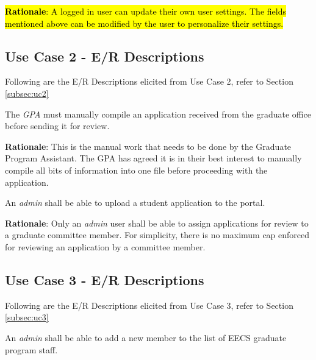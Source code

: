 \documentclass[fontsize=12pt,paper=letter,twoside]{scrartcl}
\begin{document}
\smallskip
\noindent \hl{\textbf{Rationale}: A logged in user can update their own user settings. The fields mentioned above can be modified by the user to personalize their settings.}


\subsection{Use Case 2 - E/R Descriptions}

Following are the E/R Descriptions elicited from Use Case 2, refer to Section \ref{subsec:uc2}

\genenv
{The \emph{GPA} must manually compile an application received from the graduate office before sending it for review. \\}
{}
\label{E3}

\smallskip
\noindent \textbf{Rationale}: This is the manual work that needs to be done by the Graduate Program Assistant. The GPA has agreed it is in their best interest to manually compile all bits of information into one file before proceeding with the application.

\genreq
{An \emph{admin} shall be able to upload a student application to the portal.\\}
{}
\label{R7}

\smallskip
\noindent \textbf{Rationale}: Only an \emph{admin} user shall be able to assign applications for review to a graduate committee member. For simplicity, there is no maximum cap enforced for reviewing an application by a committee member.



\subsection{Use Case 3 - E/R Descriptions}

Following are the E/R Descriptions elicited from Use Case 3, refer to Section \ref{subsec:uc3}

\genreq
{An \emph{admin} shall be able to add a new member to the list of EECS graduate program staff.\\}
{}
\label{R8}
\end{document}
